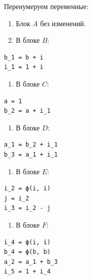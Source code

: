 \documentclass[11pt]{article}
\begin{document}
Перенумеруем переменные:
\begin{enumerate}
\item Блок \(A\) без изменений.
\item В блоке \(B\):
\end{enumerate}
\begin{verbatim}
b_1 = b + i
i_1 = 1 + i
\end{verbatim}
\begin{enumerate}
\item В блоке \(C\):
\end{enumerate}
\begin{verbatim}
a = 1
b_2 = a + i_1
\end{verbatim}
\begin{enumerate}
\item В блоке \(D\):
\end{enumerate}
\begin{verbatim}
a_1 = b_2 + i_1
b_3 = a_1 + i_1
\end{verbatim}
\begin{enumerate}
\item В блоке \(E\):
\end{enumerate}
\begin{verbatim}
i_2 = ϕ(i, i)
j = i_2
i_3 = i_2 - j
\end{verbatim}
\begin{enumerate}
\item В блоке \(F\):
\end{enumerate}
\begin{verbatim}
i_4 = ϕ(i, i)
b_4 = ϕ(b, b)
a_2 = a_1 + b_3
i_5 = 1 + i_4
\end{verbatim}
\end{document}
